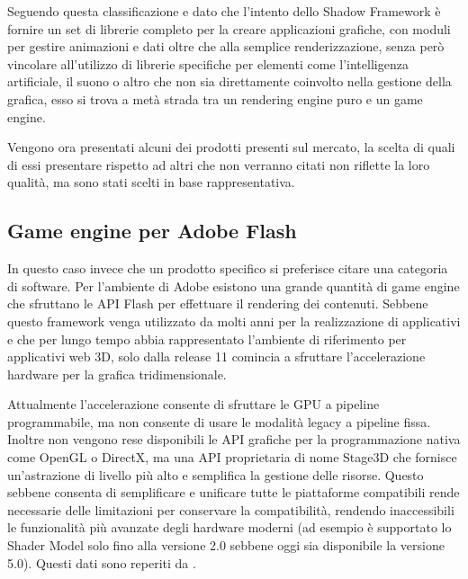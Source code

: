 Seguendo questa classificazione e dato che l'intento dello Shadow Framework \`e fornire un set di librerie completo per la creare applicazioni grafiche, con moduli per gestire animazioni e dati oltre che alla semplice renderizzazione, senza per\`o vincolare all'utilizzo di librerie specifiche per elementi come l'intelligenza artificiale, il suono o altro che non sia direttamente coinvolto nella gestione della grafica, esso si trova a met\`a strada tra un rendering engine puro e un game engine.

Vengono ora presentati alcuni dei prodotti presenti sul mercato, la scelta di quali di essi presentare rispetto ad altri che non verranno citati non riflette la loro qualit\`a, ma sono stati scelti in base rappresentativa.

\subsection{Game engine per Adobe Flash}
In questo caso invece che un prodotto specifico si preferisce citare una categoria di software. Per l'ambiente di Adobe esistono una grande quantit\`a di game engine che sfruttano le \ac{API} Flash per effettuare il rendering dei contenuti. Sebbene questo framework venga utilizzato da molti anni per la realizzazione di applicativi e che per lungo tempo abbia rappresentato l'ambiente di riferimento per applicativi web 3D, solo dalla release 11 comincia a sfruttare l'accelerazione hardware per la grafica tridimensionale.

Attualmente l'accelerazione consente di sfruttare le GPU a pipeline programmabile, ma non consente di usare le modalit\`a legacy a pipeline fissa. 
Inoltre non vengono rese disponibili le \ac{API} grafiche per la programmazione nativa come OpenGL o DirectX, ma una \ac{API} proprietaria di nome Stage3D che fornisce un'astrazione di livello pi\`u alto e semplifica la gestione delle risorse.
Questo sebbene consenta di semplificare e unificare tutte le piattaforme compatibili rende necessarie delle limitazioni per conservare la compatibilit\`a, rendendo inaccessibili le funzionalit\`a pi\`u avanzate degli hardware moderni (ad esempio \`e supportato lo Shader Model solo fino alla versione 2.0 sebbene oggi sia disponibile la versione 5.0).
Questi dati sono reperiti da \cite{site:adobestage3d}.

